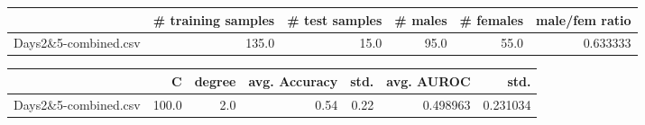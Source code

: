 \begin{tabular}{lrrrrr}
\hline
{} &  \# training samples &  \# test samples &  \# males &  \# females &  male/fem ratio \\
\hline
Days2\&5-combined.csv &               135.0 &            15.0 &     95.0 &       55.0 &        0.633333 \\
\hline
\end{tabular}
\begin{tabular}{lrrrrrr}
\hline
{} &      C &  degree &  avg. Accuracy &  std. &  avg. AUROC &      std. \\
\hline
Days2\&5-combined.csv &  100.0 &     2.0 &           0.54 &  0.22 &    0.498963 &  0.231034 \\
\hline
\end{tabular}
